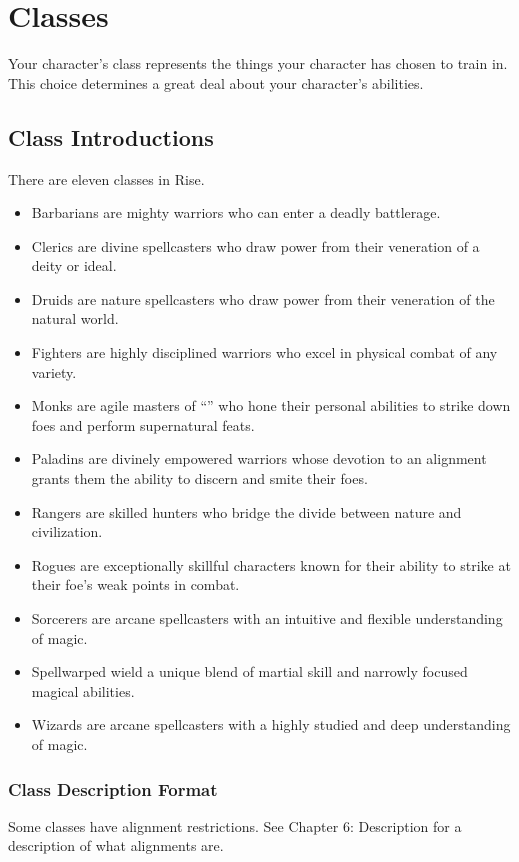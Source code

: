 \chapter{Classes}
Your character's class represents the things your character has chosen to train in. This choice determines a great deal about your character's abilities.

\section{Class Introductions}
There are eleven classes in Rise.
\begin{itemize}
  \item Barbarians are mighty warriors who can enter a deadly battlerage.
  \item Clerics are divine spellcasters who draw power from their veneration of a deity or ideal.
  \item Druids are nature spellcasters who draw power from their veneration of the natural world.
  \item Fighters are highly disciplined warriors who excel in physical combat of any variety.
  \item Monks are agile masters of ``\ki'' who hone their personal abilities to strike down foes and perform supernatural feats.
  \item Paladins are divinely empowered warriors whose devotion to an alignment grants them the ability to discern and smite their foes.
  \item Rangers are skilled hunters who bridge the divide between nature and civilization.
  \item Rogues are exceptionally skillful characters known for their ability to strike at their foe's weak points in combat.
  \item Sorcerers are arcane spellcasters with an intuitive and flexible understanding of magic.
  \item Spellwarped wield a unique blend of martial skill and narrowly focused magical abilities.
  \item Wizards are arcane spellcasters with a highly studied and deep understanding of magic.
\end{itemize}

\subsection{Class Description Format}

 Some classes have alignment restrictions. See Chapter 6: Description for a description of what alignments are.

